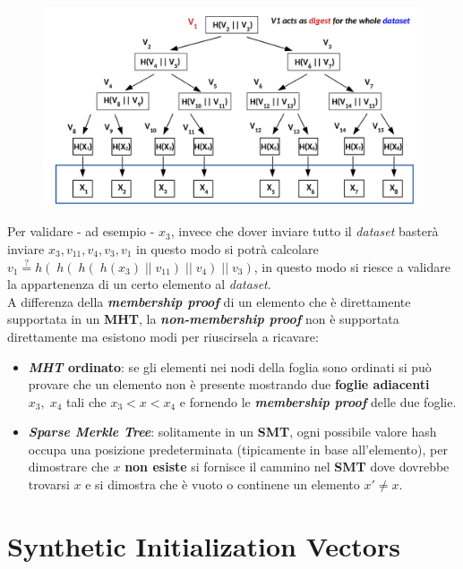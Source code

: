 \begin{flushleft}
    \begin{figure}[h]
        \centering
        \includegraphics[width=\textwidth]{img/mht.png}
    \end{figure}

    Per validare - ad esempio - $x_3$, invece che dover inviare tutto il \textit{dataset} basterà inviare $x_3, v_{11}, v_4, v_3, v_1$ in questo modo si potrà calcolare $v_1 \overset{?}{=} h(\; h(\; h(\; h(x_3) \; || \; v_{11}) \; || \; v_4) \; || \; v_3)$, in questo modo si riesce a validare la appartenenza di un certo elemento al \textit{dataset}. \\
    A differenza della \textbf{\textit{membership proof}} di un elemento che è direttamente supportata in un \textbf{MHT}, la \textbf{\textit{non-membership proof}} non è supportata direttamente ma esistono modi per riuscirsela a ricavare:
    \begin{itemize}[nosep]
        \item \textbf{\textit{MHT} ordinato}: se gli elementi nei nodi della foglia sono ordinati si può provare che un elemento non è presente mostrando due \textbf{foglie adiacenti} $x_3, \; x_4$ tali che $x_3 < x < x_4$ e fornendo le \textbf{\textit{membership proof}} delle due foglie.
        \item \textbf{\textit{Sparse Merkle Tree}}: solitamente in un \textbf{SMT}, ogni possibile valore hash occupa una posizione predeterminata (tipicamente in base all'elemento), per dimostrare che $x$ \textbf{non esiste} si fornisce il cammino nel \textbf{SMT} dove dovrebbe trovarsi $x$ e si dimostra che è vuoto o continene un elemento $x' \neq x$.
    \end{itemize}
\end{flushleft}

\section{Synthetic Initialization Vectors}

